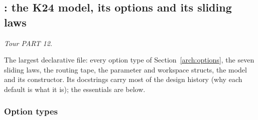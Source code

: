\subsection{: the K24 model, its options and its sliding laws}\label{ref:k24model}
\emph{Tour PART 12.}

The largest declarative file: every option type of Section~\ref{arch:options}, the seven sliding laws, the routing tape,
the parameter and workspace structs, the model and its constructor. Its docstrings carry most of the design history
(why each default is what it is); the essentials are below.

\subsubsection*{Option types}
